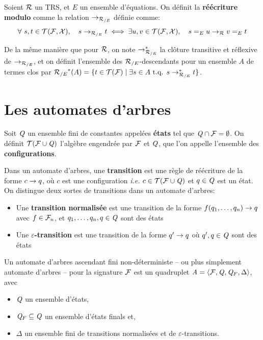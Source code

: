 \begin{definition}
  Soient $\mathcal R$ un TRS, et $E$ un ensemble d'équations. On définit la \textbf{réécriture modulo} comme la relation
  $\rightarrow_{\mathcal R_{/E}}$ définie comme:
  \[\forall\ s, t \in \mathcal{T(F, X)},\quad s \rightarrow_{\mathcal R_{/E}} t \; \Longleftrightarrow \; \exists u, v \in \mathcal{T(F, X)},\quad s =_E u \rightarrow_\mathcal R v =_E t\]
\end{definition}
De la même manière que pour $\mathcal R$, on note $\rightarrow_{\mathcal R_{/E}}^*$ la clôture transitive et réflexive de $\rightarrow_{\mathcal R_{/E}}$, et 
on définit l'ensemble des ${\mathcal R_{/E}}$-descendants pour un ensemble $A$ de termes clos par
${\mathcal R_{/E}}^*(A) = \{t \in \mathcal{T(F)} \; | \; \exists s \in A \mbox{ t.q. } s \rightarrow^*_{{\mathcal R_{/E}}} t \}$.

\section{Les automates d'arbres}
\label{sec:automates}

Soit $\mathit Q$ un ensemble fini de constantes appelées \textbf{états} tel que $\mathit Q \cap \mathcal{F}= \emptyset$.
On définit $\mathcal{ T(F \cup \mathit Q)}$ l'algèbre engendrée par $\mathcal{F}$ et $\mathit Q$, que l'on appelle l'ensemble des \textbf{configurations}.

\begin{definition}%
  \label{def:transitions}
  Dans un automate d'arbres, une \textbf{transition} est une règle de réécriture de la forme $c \rightarrow q$, où $c$ est une configuration
  \textit{i.e.} $c \in \mathcal{ T(F \cup \mathit Q)}$ et $q \in \mathit Q$ est un état. On distingue deux sortes de transitions dans un automate d'arbres:
  \begin{itemize}
  \item Une \textbf{transition normalisée} est une transition de la forme $f(q_1, \dots, q_n) \rightarrow q$
    avec $f \in \mathcal{F}_n$, et $q_1, \ldots, q_n, q \in \mathit Q$ sont des états
  \item Une \textbf{$\varepsilon$-transition} est une transition de la forme $q' \rightarrow q$ où $q', q \in \mathit Q$ sont des états
  \end{itemize}
\end{definition}


\begin{definition}%
  Un automate d'arbres ascendant fini non-déterministe -- ou plus simplement automate d'arbres --
  pour la signature $\mathcal{F}$ est un quadruplet $\mathit A= \langle \mathcal{F}, \mathit Q, \mathit Q_F,\Delta \rangle$,
  avec 
  \begin{itemize}
  \item $\mathit Q$ un ensemble d'états,
  \item $\mathit Q_F \subseteq \mathit Q$ un ensemble d'états finals et,
  \item $\Delta$ un ensemble fini de transitions normalisées et de $\varepsilon$-transitions.
  \end{itemize}
\end{definition}

